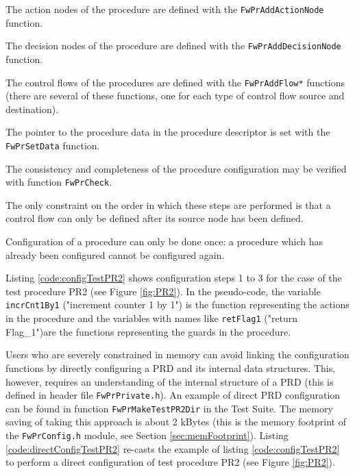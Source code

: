 \documentclass[manual]{../fwprofile}
\begin{document}
\begin{fw_enumerate}
\item The action nodes of the procedure are defined with the \texttt{FwPrAddAction\-Node} function.  
\item The decision nodes of the procedure are defined with the \texttt{FwPrAdd\-Deci\-sion\-Node} function.
\item The control flows of the procedures are defined with the \texttt{FwPrAddFlow*} functions (there are several of these functions, 
one for each type of control flow source and destination).
\item The pointer to the procedure data in the procedure descriptor is set with the \texttt{FwPrSetData} function.
\item The consistency and completeness of the procedure configuration may be verified with function \texttt{FwPrCheck}. 
\end{fw_enumerate}

The only constraint on the order in which these steps are performed is that a control flow 
can only be defined after its source node has been defined. 

Configuration of a procedure can only be done once: a procedure which has already been configured 
cannot be configured again.

Listing \ref{code:configTestPR2} shows configuration steps 1 to 3 for the case of the test procedure PR2 
(see Figure \ref{fig:PR2}). In the pseudo-code, the variable \texttt{incrCnt1By1} ("increment 
counter 1 by 1") is the function representing the actions in the procedure and the variables with names 
like \texttt{retFlag1} ("return Flag\_1")are the functions representing the guards in the procedure.

Users who are severely constrained in memory can avoid linking the configuration functions by directly 
configuring a PRD and its internal data structures. This, however, requires an understanding of the internal 
structure of a PRD (this is defined in header file \texttt{FwPrPrivate.h}). An example of direct PRD 
configuration can be found in function \texttt{FwPrMakeTestPR2Dir} in the Test Suite. The memory saving of 
taking this approach is about 2 kBytes (this is the memory footprint of the \texttt{FwPrConfig.h} module, 
see Section \ref{sec:memFootprint}). 
Listing \ref{code:directConfigTestPR2} re-casts the example of listing \ref{code:configTestPR2}
to perform a direct configuration of test procedure PR2 (see Figure \ref{fig:PR2}). 
\end{document}
